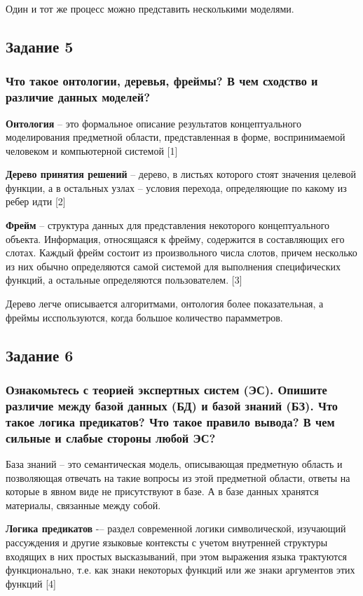 \documentclass[14pt,a4paper,report]{report}
\begin{document}
Один и тот же процесс можно представить несколькими моделями. 

\subsection{Задание 5}

\subsubsection{Что такое онтологии, деревья, фреймы? В чем сходство и различие данных моделей?}

\textbf{Онтология} -- это формальное описание результатов концептуального моделирования предметной области, представленная в форме, воспринимаемой человеком и компьютерной системой [1]

\textbf{Дерево принятия решений} -- дерево, в листьях которого стоят значения целевой функции, а в остальных узлах -- условия перехода, определяющие по какому из ребер идти [2]

\textbf{Фрейм} -- структура данных для представления некоторого концептуального объекта. Информация, относящаяся к фрейму, содержится в составляющих его слотах. Каждый фрейм состоит из произвольного числа слотов, причем несколько из них обычно определяются самой системой для выполнения специфических функций, а остальные определяются пользователем. [3]

Дерево легче описывается алгоритмами, онтология более показательная, а фреймы исспользуются, когда большое количество парамметров.

\subsection{Задание 6}

\subsubsection{Ознакомьтесь с теорией экспертных систем (ЭС). Опишите различие между базой данных (БД) и базой знаний (БЗ). Что такое логика предикатов? Что такое правило вывода? В чем сильные и слабые стороны любой ЭС?}

База знаний -- это семантическая модель, описывающая предметную область и позволяющая отвечать на такие вопросы из этой предметной области, ответы на которые в явном виде не присутствуют в базе. А в базе данных хранятся материалы, связанные между собой. 

\textbf{Логика предикатов} -– раздел современной логики символической, изучающий рассуждения и другие языковые контексты с учетом внутренней структуры входящих в них простых высказываний, при этом выражения языка трактуются функционально, т.е. как знаки некоторых функций или же знаки аргументов этих функций [4]
\end{document}
